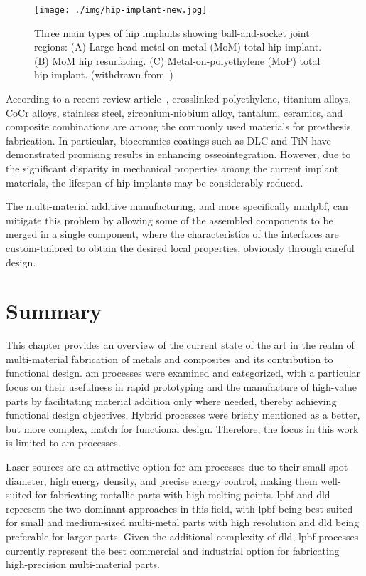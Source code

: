 \begin{figure}[!hbtp]
  \centering
    \texttt{[image: ./img/hip-implant-new.jpg]}
  \caption[Hip prosthesis and components detail]{Three main types of hip implants showing ball-and-socket joint regions: (A) Large head metal-on-metal (MoM) total hip implant. (B) MoM hip resurfacing. (C) Metal-on-polyethylene (MoP) total hip implant.
    (withdrawn from~\cite{eltit2019mechanisms}\footnotemark)}%
  \label{fig:hip-implant}
\end{figure}
%
%

According to a recent review article~\cite{rafiq2022review}, crosslinked polyethylene, titanium alloys, CoCr alloys, stainless steel, zirconium-niobium alloy, tantalum, ceramics, and composite combinations are among the commonly used materials for prosthesis fabrication. In particular, bioceramics coatings such as DLC and TiN have demonstrated promising results in enhancing osseointegration. However, due to the significant disparity in mechanical properties among the current implant materials, the lifespan of hip implants may be considerably reduced.

The multi-material additive manufacturing, and more specifically \gls{mmlpbf},  can mitigate this problem by allowing
some of the assembled components to be merged in a single component, where the
characteristics of the interfaces are custom-tailored to obtain the desired local properties, obviously through careful design.

\section{Summary}%
\label{sec:summary-state}
This chapter provides an overview of the current state of the art in the realm
of multi-material fabrication of metals and composites and its contribution to
functional design. \gls{am} processes were examined and categorized, with a
particular focus on their usefulness in rapid prototyping and the manufacture of
high-value parts by facilitating material addition only where needed, thereby
achieving functional design objectives.
Hybrid
processes were briefly mentioned as a better, but more complex, match for
functional design. Therefore, the focus in this work is limited to \gls{am} processes.

Laser sources are an attractive option for \gls{am} processes due to their small spot diameter, high energy density, and precise energy control, making them well-suited for fabricating metallic parts with high melting points. \gls{lpbf} and \gls{dld} represent the two dominant approaches in this field, with \gls{lpbf} being best-suited for small and medium-sized multi-metal parts with high resolution and \gls{dld} being preferable for larger parts. Given the additional complexity of \gls{dld}, \gls{lpbf} processes currently represent the best commercial and industrial option for fabricating high-precision multi-material parts.

